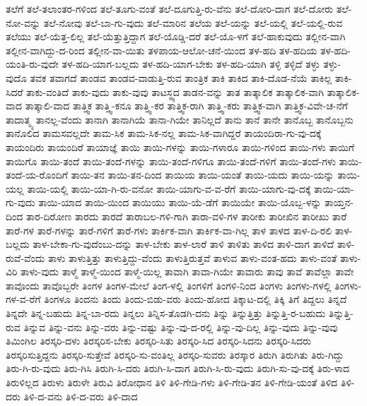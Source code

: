 {ತಲೆಗೆ
ತಲೆ-ತಲಾಂತರ-ಗಳಿಂದ
ತಲೆ-ತೂಗು-ವಂತೆ
ತಲೆ-ದೂಗುತ್ತಿ-ರು-ವೆನು
ತಲೆ-ದೋರಿ-ದಾಗ
ತಲೆ-ದೋರು
ತಲೆ-ನೋ-ವನ್ನು
ತಲೆ-ನೋವು
ತಲೆ-ಬಾ-ಗು-ವುದು
ತಲೆ-ಮಾರಿನ
ತಲೆಯ
ತಲೆ-ಯನ್ನು
ತಲೆ-ಯಲ್ಲಿ
ತಲೆ-ಯಲ್ಲಿ-ರುವ
ತಲೆಯು
ತಲೆ-ಯೆತ್ತ-ಲಿಲ್ಲ
ತಲೆ-ಯೆತ್ತುತ್ತಿದ್ದಾಗ
ತಲೆ-ಯೊಡ್ಡಿ-ದರೆ
ತಲೆ-ಯೊ-ಳಗೆ
ತಲೆ-ಹಾಕುವುದು
ತಲ್ಲೀನ-ವಾಗಿ
ತಲ್ಲೀನ-ವಾಗಿದ್ದು-ದ-ರಿಂದ
ತಲ್ಲೀನ-ವಾ-ಯಿತು
ತಳಪಾಯ-ಆಲೋ-ಚನೆ-ಯಿಂದ
ತಳ-ಹದಿ
ತಳ-ಹದಿಯ
ತಳ-ಹದಿ-ಯಂತಿ-ರು-ವುದೇ
ತಳ-ಹದಿ-ಯಾಗ-ಬಲ್ಲದು
ತಳ-ಹದಿ-ಯಾಗ-ಬೇಕು
ತಳ-ಹದಿ-ಯಾಗಿ
ತಳ್ಳಿ
ತಳ್ಳಿದೆ
ತಳ್ಳು
ತಳ್ಳು-ವುದೊ
ತವಕ
ತವಾಗದೆ
ತಾಂಡವ
ತಾಂಡವ-ವಾಡುತ್ತಿ-ರುವ
ತಾಂತ್ರಿಕ
ತಾಕಿ
ತಾಕಿದ
ತಾಕಿ-ದೊಡ-ನೆಯೆ
ತಾಕಿಲ್ಲ
ತಾಕಿ-ಸಿದರೆ
ತಾಕು-ವಂತಿದೆ
ತಾಕು-ವುದು
ತಾಕು-ವುವು
ತಾಟಸ್ಥ್ಯದ
ತಾಡನ-ವನ್ನು
ತಾತ
ತಾತ್ಕಾಲಿಕ
ತಾತ್ಕಾಲಿಕ-ವಾಗಿ
ತಾತ್ಕಾಲಿಕ-ವಾದ
ತಾತ್ಕಾಲಿ-ವಾದ
ತಾತ್ತ್ವಿಕ
ತಾತ್ತ್ವಿ-ಕನೂ
ತಾತ್ತ್ವಿ-ಕರ
ತಾತ್ತ್ವಿಕ-ರಾಗಿ
ತಾತ್ತ್ವಿ-ಕರು
ತಾತ್ತ್ವಿಕ-ವಾಗಿ
ತಾತ್ತ್ವಿಕ-ವಿವೇ-ಚ-ನೆಗೆ
ತಾದಾತ್ಮ್ಯ
ತಾನಲ್ಲ-ವೆಂದು
ತಾನಾಗಿ
ತಾನಾಗಿಯೆ
ತಾನಾ-ಗಿಯೇ
ತಾನಿಲ್ಲದೆ
ತಾನು
ತಾನೆ
ತಾನೇ
ತಾನೊಬ್ಬ
ತಾನೊಬ್ಬನು
ತಾನೊಲಿದ
ತಾಮಸವಲ್ಲದೇ
ತಾಮ-ಸಿಕ
ತಾಮ-ಸಿಕ-ನಲ್ಲ
ತಾಮ-ಸಿಕ-ವಾಗಿದ್ದರೆ
ತಾಯಂದಿರಾ-ಗು-ವು-ದಕ್ಕೆ
ತಾಯಂದಿರು
ತಾಯಂದಿರೆ
ತಾಯಾಜ್ಞೆ
ತಾಯಿ
ತಾಯಿ-ಗಳನ್ನು
ತಾಯಿ-ಗಳಾರೂ
ತಾಯಿ-ಗಳಿಂದ
ತಾಯಿ-ಗಳು
ತಾಯಿಗೆ
ತಾಯಿಗೊ
ತಾಯಿ-ತಂದೆ
ತಾಯಿ-ತಂದೆ-ಗಳನ್ನು
ತಾಯಿ-ತಂದೆ-ಗಳಿಗೂ
ತಾಯಿ-ತಂದೆ-ಗಳಿಗೆ
ತಾಯಿ-ತಂದೆ-ಗಳು
ತಾಯಿ-ತಂದೆ-ಯ-ರೊಂದಿಗೆ
ತಾಯಿ-ತನ
ತಾಯಿ-ತನ-ದಿಂದ
ತಾಯಿಯ
ತಾಯಿ-ಯಂತೆ
ತಾಯಿ-ಯದು
ತಾಯಿ-ಯನ್ನು
ತಾಯಿ-ಯಲ್ಲ
ತಾಯಿ-ಯಲ್ಲಿ
ತಾಯಿ-ಯಾ-ಗಿ-ರು-ವನೋ
ತಾಯಿ-ಯಾಗು-ವ-ವ-ರೆಗೆ
ತಾಯಿ-ಯಾಗು-ವು-ದಕ್ಕೆ
ತಾಯಿ-ಯಾ-ಗು-ವುದು
ತಾಯಿ-ಯಾದ
ತಾಯಿ-ಯಿಂದ
ತಾಯಿಯು
ತಾಯಿ-ಯೆ-ಡೆಗೆ
ತಾಯಿಯೇ
ತಾಯಿ-ಯೊಬ್ಬ-ಳನ್ನು
ತಾಯ್ತನ-ದಿಂದ
ತಾರ-ದಿರೋಣ
ತಾರದು
ತಾರದೆ
ತಾರಾಬಲ-ಗಳಿ-ಗಾಗಿ
ತಾರಾ-ವಳಿ-ಗಳ
ತಾರೀಕು
ತಾರೀಖಿನ
ತಾರೀಖು
ತಾರೆ
ತಾರೆ-ಗಳ
ತಾರೆ-ಗಳನ್ನು
ತಾರೆ-ಗಳಿಗೆ
ತಾರೆ-ಗಳು
ತಾರ್ಕಿಕ-ವಾಗಿ
ತಾರ್ಕಿಕ-ವಾ-ಗಿಲ್ಲ
ತಾಳ
ತಾಳದ
ತಾಳ-ದಿ-ರಲಿ
ತಾಳ-ಬಲ್ಲದು
ತಾಳ-ಬೇಕಾ-ಗು-ವುದೆಂಬು-ದನ್ನು
ತಾಳ-ಬೇಕು
ತಾಳ-ಲಾರೆ
ತಾಳಿ
ತಾಳಿತು
ತಾಳಿದ
ತಾಳಿ-ದಾಗ
ತಾಳಿದೆ
ತಾಳಿ-ರುವೆ-ವೆಂದು
ತಾಳು
ತಾಳುತ್ತಿತ್ತು
ತಾಳುತ್ತಿದ್ದು-ವೆಂದು
ತಾಳುತ್ತಿರುತ್ತವೆ
ತಾಳುವ
ತಾಳು-ವಂತ-ಹದು
ತಾಳು-ವಂತೆ
ತಾಳು-ವಿರಿ
ತಾಳು-ವುದು
ತಾಳ್ಮೆ
ತಾಳ್ಮೆ-ಯಿಂದ
ತಾಳ್ಮೆ-ಯಿಲ್ಲ
ತಾವಾಗಿ
ತಾವಾ-ಗಿಯೇ
ತಾವಾರು
ತಾವು
ತಾವೆ
ತಾವೆಲ್ಲಾ
ತಾವೇ
ತಾವೊಂದು
ತಾವೊಬ್ಬರೇ
ತಿಂಗಳ
ತಿಂಗಳ-ಮೇಲೆ
ತಿಂಗ-ಳಲ್ಲಿ
ತಿಂಗಳಿಗೆ
ತಿಂಗಳಿ-ನಿಂದ
ತಿಂಗಳು
ತಿಂಗಳು-ಗಳಲ್ಲಿ
ತಿಂಗಳು-ಗಳ-ವ-ರೆಗೆ
ತಿಂಗಳೂ
ತಿಂದನು
ತಿಂದು
ತಿಂದು-ಬಿಡು-ವರು
ತಿಂದು-ಹೋದ
ತಿಕ್ಕಾಟ-ದಲ್ಲಿ
ತಿಕ್ಕಿ
ತಿಗೆ
ತಿದ್ದಲು
ತಿನ್ನದೆ
ತಿನ್ನದೇ
ತಿನ್ನ-ಬಹುದು
ತಿನ್ನ-ಬಾ-ರದು
ತಿನ್ನಲು
ತಿನ್ನಿಸ-ತೊಡಗಿ-ದನು
ತಿನ್ನು
ತಿನ್ನುತ್ತಿತ್ತು
ತಿನ್ನುತ್ತಿ-ರ-ಬಹುದು
ತಿನ್ನುತ್ತಿ-ರುವ
ತಿನ್ನುವ
ತಿನ್ನು-ವನು
ತಿನ್ನು-ವರು
ತಿನ್ನು-ವಷ್ಟು
ತಿನ್ನು-ವು-ದ-ರಲ್ಲಿ
ತಿನ್ನು-ವು-ದಿಲ್ಲ
ತಿನ್ನು-ವುದು
ತಿನ್ನು-ವುವು
ತಿಮಿಂಗಿಲ
ತಿರಸ್ಕರಿ-ದಳು
ತಿರಸ್ಕರಿಸ-ಬೇಕು
ತಿರಸ್ಕರಿ-ಸಿತು
ತಿರಸ್ಕರಿ-ಸಿದ
ತಿರಸ್ಕರಿ-ಸಿದನು
ತಿರಸ್ಕರಿ-ಸಿದರು
ತಿರಸ್ಕರಿಸುತ್ತಿದ್ದನು
ತಿರಸ್ಕರಿ-ಸುತ್ತೇವೆ
ತಿರಸ್ಕರಿ-ಸು-ವಂತಿಲ್ಲ
ತಿರಸ್ಕರಿ-ಸುವರು
ತಿರಸ್ಕಾರ
ತಿರುಗಿ
ತಿರುಗಿತು
ತಿರು-ಗಿದ್ದು
ತಿರು-ಗಿ-ರು-ವುದು
ತಿರು-ಗಿಸಿ
ತಿರುಗಿ-ಸಿ-ದರು
ತಿರುಗಿ-ಸಿ-ದಾಗ
ತಿರುಗಿ-ಸಿ-ರು-ವುದು
ತಿರುಗಿ-ಸು-ವು-ದಕ್ಕೆ
ತಿರು-ಳಾದ
ತಿರುಳಿಲ್ಲದ
ತಿರುಳು
ತಿರುಳೇ
ತಿರುವಿ
ತಿರೋಧಾನ
ತಿಳಿ
ತಿಳಿ-ಗೇಡಿ-ಗಳು
ತಿಳಿ-ಗೇಡಿ-ತನ
ತಿಳಿ-ಗೇಡಿ-ಯಂತೆ
ತಿಳಿದ
ತಿಳಿ-ದರು
ತಿಳಿ-ದ-ವನು
ತಿಳಿ-ದ-ವರು
ತಿಳಿ-ದಾದ
}
